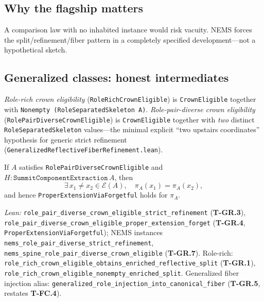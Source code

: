 \documentclass[11pt]{article}
\begin{document}
\subsection{Why the flagship matters}\label{sec:flagship-matters}
A comparison law with no inhabited instance would risk vacuity. NEMS forces the split/refinement/fiber pattern in a completely specified development---not a hypothetical sketch.

\subsection{Generalized classes: honest intermediates}\label{sec:flagship-generalization}
\begin{definition}\label{def:role-rich}
\emph{Role-rich crown eligibility} (\texttt{RoleRichCrownEligible}) is \texttt{CrownEligible} together with \texttt{Nonempty (RoleSeparatedSkeleton A)}. \emph{Role-pair-diverse crown eligibility} (\texttt{RolePairDiverseCrownEligible}) is \texttt{CrownEligible} together with \emph{two} distinct \texttt{RoleSeparatedSkeleton} values---the minimal explicit ``two upstairs coordinates'' hypothesis for generic strict refinement (\texttt{GeneralizedReflectiveFiberRefinement.lean}).
\end{definition}

\begin{theorem}\label{thm:gen-refinement}
If $A$ satisfies \texttt{RolePairDiverseCrownEligible} and $H : \texttt{SummitComponentExtraction}\,A$, then
\[
  \exists\, x_1 \neq x_2 \in \mathcal{E}(A),\quad \pi_A(x_1) = \pi_A(x_2),
\]
and hence \texttt{ProperExtensionViaForgetful} holds for $\pi_A$.
\end{theorem}

\noindent\emph{Lean:} \texttt{role\_pair\_diverse\_crown\_eligible\_strict\_refinement} (\textbf{T-GR.3}), \texttt{role\_pair\_diverse\_crown\_eligible\_proper\_extension\_forget} (\textbf{T-GR.4}, \texttt{ProperExtensionViaForgetful}); NEMS instances \texttt{nems\_role\_pair\_diverse\_strict\_refinement}, \texttt{nems\_spine\_role\_pair\_diverse\_crown\_eligible} (\textbf{T-GR.7}). Role-rich: \texttt{role\_rich\_crown\_eligible\_obtains\_enriched\_reflective\_split} (\textbf{T-GR.1}), \texttt{role\_rich\_crown\_eligible\_nonempty\_enriched\_split}. Generalized fiber injection alias: \texttt{generalized\_role\_injection\_into\_canonical\_fiber} (\textbf{T-GR.5}, restates \textbf{T-FC.4}).
\end{document}
